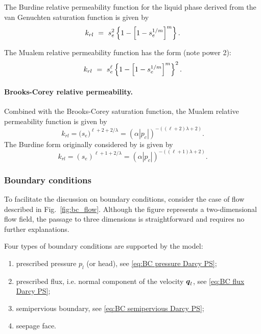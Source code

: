 The Burdine relative permeability function for the liquid phase derived
from the van Genuchten saturation function is given by
\begin{equation}
  k_{rl} \ =\  s_e^{2} \left\{ 1 - \left[ 1 - s_e^{1/m} \right]^m \right\}.
  \label{eq:krl_vGB} 
\end{equation}

The Mualem 
relative permeability function has the form (note power 2):
\begin{equation}
  k_{rl} \ =\  s_e^{\ell} \left\{ 1 - \left[ 1 - s_e^{1/m} \right]^m \right\}^2.
  \label{eq:krl_vGM} 
\end{equation}




\paragraph{Brooks-Corey relative permeability.}
Combined with the Brooks-Corey saturation function, the Mualem
relative permeability function is given by
\begin{equation} \label{eq:krl_BCM}
  k_{rl} = \big(s_e\big)^{\ell+2+2/\lambda} 
         = \left(\alpha |p_c|\right)^{-((\ell+2)\lambda+2)}.
\end{equation}
The Burdine form originally considered by \citet{brooks1964hydraulic}
is given by
\begin{equation} \label{eq:krl_BCB}
  k_{rl} = \left( s_e \right)^{ \ell+1+2/\lambda}
         = \left( \alpha |p_c| \right)^{-((\ell+1)\lambda+2)}.
\end{equation}




\subsubsection{Boundary conditions}  
%
To facilitate the discussion on boundary conditions, consider the case of 
flow described in Fig.~\ref{fig:bc_flow}. 
Although the figure represents a two-dimensional flow field, the passage to three dimensions 
is straightforward and requires no further explanations. 

Four types of boundary conditions are supported by the model:
\begin{enumerate}
\item
  prescribed pressure $p_l$ (or head), see \eqref{eq:BC pressure Darcy PS};
\item
  prescribed flux, i.e. normal component of the velocity ${\boldsymbol{q}}_l$, see \eqref{eq:BC flux Darcy PS};
\item
  semipervious boundary, see \eqref{eq:BC semipervious Darcy PS}; %
\item
  seepage face.
\end{enumerate}



